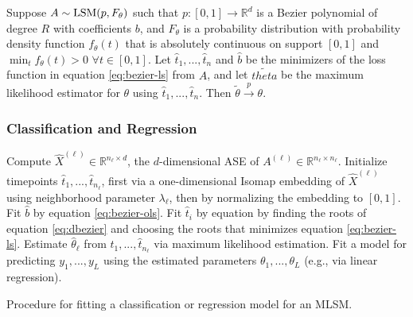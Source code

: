 \documentclass[12pt]{article}
\begin{document}
\begin{theorem}
Suppose $A \sim \mathrm{LSM}(p, F_\theta)$ such that $p : [0, 1] \to \mathbb{R}^d$ is a Bezier polynomial of degree $R$ with coefficients $b$, and $F_\theta$ is a probability distribution with probability density function $f_\theta(t)$ that is absolutely continuous on support $[0, 1]$ and $\min_t f_\theta(t) > 0$ $\forall t \in [0, 1]$. 
Let $\hat{t}_1, ..., \hat{t}_n$ and $\hat{b}$ be the minimizers of the loss function in equation \ref{eq:bezier-ls} from $A$, and let $\tilde{theta}$ be the maximum likelihood estimator for $\theta$ using $\hat{t}_1, ..., \hat{t}_n$. 
Then $\tilde{\theta} \stackrel{p}{\to} \theta$. 
\end{theorem}

\hypertarget{classification-and-regression}{%
\subsubsection{Classification and
Regression}\label{classification-and-regression}}

\begin{algorithm}[H]
\label{alg:mlsm-fit}
\DontPrintSemicolon
\SetAlgoLined
{}
 {
  Compute $\hat{X}^{(\ell)} \in \mathbb{R}^{n_\ell \times d}$, the $d$-dimensional ASE of $A^{(\ell)} \in \mathbb{R}^{n_\ell \times n_\ell}$.\;
  Initialize timepoints $\hat{t}_1, ..., \hat{t}_{n_\ell}$, first via a one-dimensional Isomap embedding of $\hat{X}^{(\ell)}$ using neighborhood parameter $\lambda_\ell$, then by normalizing the embedding to $[0, 1]$.\;
   {
    Fit $\hat{b}$ by equation \ref{eq:bezier-ols}.\;
     {
      Fit $\hat{t}_i$ by equation by finding the roots of equation \ref{eq:dbezier} and choosing the roots that minimizes equation \ref{eq:bezier-ls}.\;
    }
  }
  Estimate $\hat{\theta}_\ell$ from $\hat{t}_1, ..., \hat{t}_{n_\ell}$ via maximum likelihood estimation.\;
}
Fit a model for predicting $y_1, ..., y_L$ using the estimated parameters $\theta_1, ..., \theta_L$ (e.g., via linear regression).\;
\caption{Procedure for fitting a classification or regression model for an MLSM.}
\end{algorithm}
\end{document}
